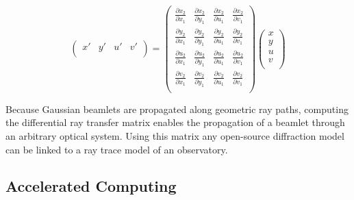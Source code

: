 \begin{center}
    
\begin{equation}
    \begin{pmatrix}
    x' & y' & u' & v' \\
    \end{pmatrix}
    =
    \begin{pmatrix}
    \frac{\partial x_2}{\partial x_1} & \frac{\partial x_2}{\partial y_1} & \frac{\partial x_2}{\partial u_1} & \frac{\partial x_2}{\partial v_1}  \\
    \frac{\partial y_2}{\partial x_1} & \frac{\partial y_2}{\partial y_1} & \frac{\partial y_2}{\partial u_1} & \frac{\partial y_2}{\partial v_1}  \\
    \frac{\partial u_2}{\partial x_1} & \frac{\partial u_2}{\partial y_1} & \frac{\partial u_2}{\partial u_1} & \frac{\partial u_2}{\partial v_1} \\
    \frac{\partial v_2}{\partial x_1} & \frac{\partial v_2}{\partial y_1} & \frac{\partial v_2}{\partial u_1} & \frac{\partial v_2}{\partial v_1} \\
    \end{pmatrix}
    \begin{pmatrix}
    x \\
    y \\
    u \\
    v \\
    \end{pmatrix}
    \label{eq:diffmat}
\end{equation}

\end{center}
Because Gaussian beamlets are propagated along geometric ray paths, computing the differential ray transfer matrix enables the propagation of a beamlet through an arbitrary optical system. Using this matrix any open-source diffraction model can be linked to a ray trace model of an observatory.

\subsection{Accelerated Computing}


